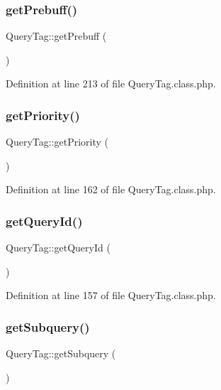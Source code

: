 \subsubsection{\texorpdfstring{get\+Prebuff()}{getPrebuff()}}
{\footnotesize\ttfamily Query\+Tag\+::get\+Prebuff (\begin{DoxyParamCaption}{ }\end{DoxyParamCaption})}



Definition at line 213 of file Query\+Tag.\+class.\+php.

\mbox{\label{classQueryTag_a0c0f1e47dfb8ef88370c400235992d00}} 
\subsubsection{\texorpdfstring{get\+Priority()}{getPriority()}}
{\footnotesize\ttfamily Query\+Tag\+::get\+Priority (\begin{DoxyParamCaption}{ }\end{DoxyParamCaption})}



Definition at line 162 of file Query\+Tag.\+class.\+php.

\mbox{\label{classQueryTag_a449bdb9218e0ea9058720e539a99268e}} 
\subsubsection{\texorpdfstring{get\+Query\+Id()}{getQueryId()}}
{\footnotesize\ttfamily Query\+Tag\+::get\+Query\+Id (\begin{DoxyParamCaption}{ }\end{DoxyParamCaption})}



Definition at line 157 of file Query\+Tag.\+class.\+php.

\mbox{\label{classQueryTag_a93b8852f75ce2f6df45efe2742eb2b48}} 
\subsubsection{\texorpdfstring{get\+Subquery()}{getSubquery()}}
{\footnotesize\ttfamily Query\+Tag\+::get\+Subquery (\begin{DoxyParamCaption}{ }\end{DoxyParamCaption})}



